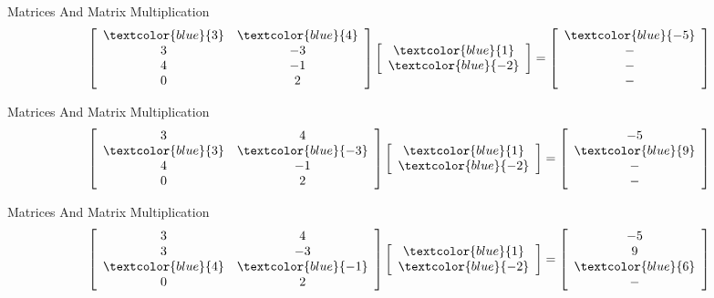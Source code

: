 \begin{frame}{Matrices And Matrix Multiplication}
\[ \left[ \begin{array}{cc} \textcolor{blue}{ 3 } & \textcolor{blue}{ 4 }  \\ 3 & -3  \\ 4 & -1  \\ 0 & 2 \end{array} \right]  \left[ \begin{array}{c} \textcolor{blue}{ 1 }  \\ \textcolor{blue}{ -2 } \end{array} \right]   =  \left[ \begin{array}{c} \textcolor{blue}{ -5 }  \\ -  \\ -  \\ - \end{array} \right]  \]
\end{frame}


\begin{frame}{Matrices And Matrix Multiplication}
\[ \left[ \begin{array}{cc} 3 & 4  \\ \textcolor{blue}{ 3 } & \textcolor{blue}{ -3 }  \\ 4 & -1  \\ 0 & 2 \end{array} \right]  \left[ \begin{array}{c} \textcolor{blue}{ 1 }  \\ \textcolor{blue}{ -2 } \end{array} \right]   =  \left[ \begin{array}{c} -5  \\ \textcolor{blue}{ 9 }  \\ -  \\ - \end{array} \right]  \]
\end{frame}


\begin{frame}{Matrices And Matrix Multiplication}
\[ \left[ \begin{array}{cc} 3 & 4  \\ 3 & -3  \\ \textcolor{blue}{ 4 } & \textcolor{blue}{ -1 }  \\ 0 & 2 \end{array} \right]  \left[ \begin{array}{c} \textcolor{blue}{ 1 }  \\ \textcolor{blue}{ -2 } \end{array} \right]   =  \left[ \begin{array}{c} -5  \\ 9  \\ \textcolor{blue}{ 6 }  \\ - \end{array} \right]  \]
\end{frame}


